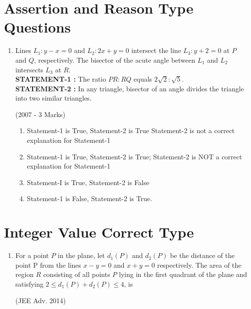 \documentclass[journal,12pt,twocolumn]{IEEEtran}
\theoremstyle{remark}
\begin{document}
\section{Assertion and Reason Type Questions} 
\begin{enumerate}
\item Lines $L_{1}: y-x=0$ and $L_{2}: 2x+y=0$ intersect the line $L_{3}: y+2=0$ at $P$ and $Q$, respectively. The bisector of the acute 
angle between $L_{1}$ and $L_{2}$ intersects $L_{3}$ at $R$.\\
\textbf{STATEMENT-1 :} The ratio $PR:RQ$ equals $2\sqrt{2}:\sqrt{5}$.\\
\textbf{STATEMENT-2 :} In any triangle, bisector of an angle divides the triangle into two similar triangles.

\hfill{(2007 - 3 Marks)}
   \begin{enumerate}[label=(\alph*)]
   \item Statement-1 is True, Statement-2 is True Statement-2 
is not a correct explanation for Statement-1 
   \item Statement-1 is True, Statement-2 is True; Statement-2 
is NOT a correct explanation for Statement-1 
   \item Statement-I is True, Statement-2 is False
   \item Statement-1 is False, Statement-2 is True. 
   \end{enumerate}
\end{enumerate}

\section{Integer Value Correct Type}
\begin{enumerate}
\item For a point $P$ in the plane, let $d_{1}(P)$ and $d_{2}(P)$ be the 
distance of the point P from the lines $x-y=0$ and $x+y =0$ 
respectively. The area of the region $R$ consisting of all points 
$P$ lying in the first quadrant of the plane and satisfying
$2\leq d_{1}(P)+d_{2}(P) \leq4$, is

		\hfill{(JEE Adv. 2014)}
\end{enumerate}
\end{document}

